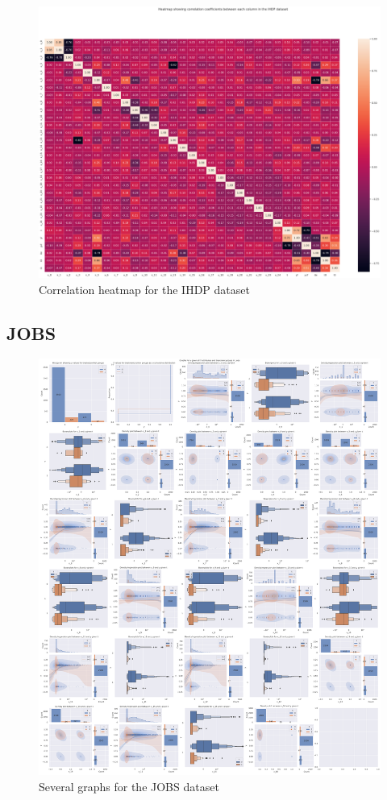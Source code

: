 \documentclass{article}
\begin{document}
\begin{figure}[tb]
\centering
\includegraphics[width=1\textwidth]{project/data/ihdp_heatmap.pdf}
\caption{\label{fig:ihdp_correlation}Correlation heatmap for the IHDP dataset}
\end{figure}



\subsection{JOBS}

\begin{figure}[tb]
\centering
\includegraphics[width=1\textwidth]{project/data/jobs_graphs.pdf}
\caption{\label{fig:jobsgraphs}Several graphs for the JOBS dataset}
\end{figure}
\end{document}
